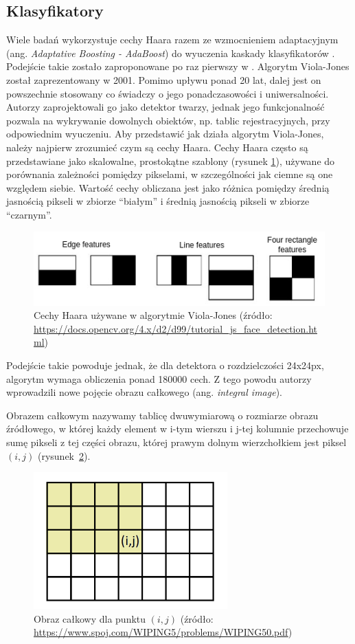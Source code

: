 \subsection{Klasyfikatory}
Wiele badań wykorzystuje cechy Haara razem ze wzmocnieniem adaptacyjnym (ang. \textit{Adaptative Boosting - AdaBoost}) do wyuczenia kaskady klasyfikatorów \cite{9310202}.
Podejście takie zostało zaproponowane po raz pierwszy w \cite{990517}.
Algorytm Viola-Jones został zaprezentowany w 2001.
Pomimo upływu ponad 20 lat, dalej jest on powszechnie stosowany co świadczy o jego ponadczasowości i uniwersalności.
Autorzy zaprojektowali go jako detektor twarzy, jednak jego funkcjonalność pozwala na wykrywanie dowolnych obiektów, np. tablic rejestracyjnych, przy odpowiednim wyuczeniu.
Aby przedstawić jak działa algorytm Viola-Jones, należy najpierw zrozumieć czym są cechy Haara.
Cechy Haara często są przedstawiane jako skalowalne, prostokątne szablony (rysunek \ref{fig:haar_feats}), używane do porównania zależności pomiędzy pikselami, w szczególności jak ciemne są one względem siebie.
Wartość cechy obliczana jest jako różnica pomiędzy średnią jasnością pikseli w zbiorze ``białym'' i średnią jasnością pikseli w zbiorze ``czarnym''.
\begin{figure}[!ht]
    \centering
    \includegraphics[scale=0.6]{Pictures/haar_feats}
    \caption{Cechy Haara używane w algorytmie Viola-Jones (źródło: \url{https://docs.opencv.org/4.x/d2/d99/tutorial_js_face_detection.html})}
    \label{fig:haar_feats}
\end{figure}
\FloatBarrier
Podejście takie powoduje jednak, że dla detektora o rozdzielczości 24x24px, algorytm wymaga obliczenia ponad 180000 cech.
Z tego powodu autorzy wprowadzili nowe pojęcie obrazu całkowego (ang. \textit{integral image}).
\begin{theorem}
    Obrazem całkowym nazywamy tablicę dwuwymiarową o rozmiarze obrazu źródłowego, w której każdy element w i-tym wierszu i j-tej kolumnie przechowuje sumę pikseli z tej części obrazu, której prawym dolnym wierzchołkiem jest piksel $(i, j)$ (rysunek~\ref{fig:ii_cords}).
\end{theorem}
\begin{figure}[!htb]
    \centering
    \includegraphics[scale=0.6]{Pictures/ii_cords}
    \caption{Obraz całkowy dla punktu $(i, j)$ (źródło: \url{https://www.spoj.com/WIPING5/problems/WIPING50.pdf})}
    \label{fig:ii_cords}
\end{figure}

